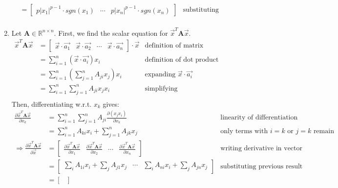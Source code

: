\documentclass[11pt]{article}
\newcommand{\pd}[2]{\frac{\partial #1}{\partial #2}}
\begin{document}
\begin{enumerate}
\begin{align*}
        &= \begin{bmatrix}
            p |x_1|^{p - 1} \cdot sgn(x_1) & \cdots & p |x_n|^{p - 1} \cdot sgn(x_n)
        \end{bmatrix} & \text{substituting previous result} \\
    \end{align*}
    \item Let $\textbf{A} \in \mathbb{R}^{n \times n}$. First, we find the scalar equation for $\vec{x}^T \textbf{A} \vec{x}$.
    \begin{align*}
        \vec{x}^T \textbf{A} \vec{x} &= \begin{bmatrix}
            \vec{x} \cdot \vec{a_1} & \vec{x} \cdot \vec{a_2} & \cdots & \vec{x} \cdot \vec{a_n}
        \end{bmatrix} \cdot \vec{x} & \text{definition of matrix multiplication} \\
        &= \sum_{i=1}^{n} (\vec{x} \cdot \vec{a_i}) x_i & \text{definition of dot product} \\
        &= \sum_{i=1}^{n} \left( \sum_{j=1}^{n} A_{ji} x_j \right) x_i & \text{expanding } \vec{x} \cdot \vec{a_i} \\
        &= \sum_{i=1}^{n} \sum_{j=1}^{n} A_{ji} x_j x_i & \text{simplifying} \\
    \end{align*}
    Then, differentiating w.r.t. $x_k$ gives:
    \begin{align*}
        \pd{\vec{x}^T \textbf{A} \vec{x}}{x_k} &= \sum_{i=1}^{n} \sum_{j=1}^{n} A_{ji} \pd{(x_j x_i)}{x_k} & \text{linearity of differentiation} \\
        &= \sum_{i=1}^{n} A_{ki} x_i + \sum_{j=1}^{n} A_{jk} x_j & \text{only terms with } i = k \text{ or } j = k \text{ remain} \\
        \Rightarrow \pd{\vec{x}^T \textbf{A} \vec{x}}{\vec{x}} &= \begin{bmatrix}
            \pd{\vec{x}^T \textbf{A} \vec{x}}{x_1} & \pd{\vec{x}^T \textbf{A} \vec{x}}{x_2} & \cdots & \pd{\vec{x}^T \textbf{A} \vec{x}}{x_n}
        \end{bmatrix} & \text{writing derivative in vector form} \\
        &= \begin{bmatrix}
            \sum_{i} A_{1i} x_i + \sum_{j} A_{j1} x_j & \cdots & \sum_{i} A_{ni} x_i + \sum_{j} A_{jn} x_j
        \end{bmatrix} & \text{substituting previous result} \\
        &= \begin{bmatrix}

\end{bmatrix}
\end{align*}
\end{enumerate}
\end{document}
